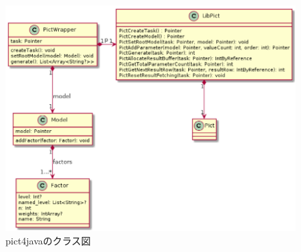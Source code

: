 \documentclass[uplatex, report, a4j, 10pt]{jsbook}
\begin{document}
\begin{figure}[tp]
  \centering
  \includegraphics[keepaspectratio, width=160mm]{figs/pict4java_class}
  \caption{pict4javaのクラス図}
  \label{fig:pict4javaClass}
\end{figure}
\end{document}
